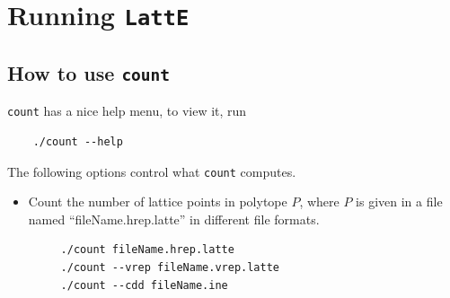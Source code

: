 \documentclass{article}
\begin{document}
\section{Running {\tt LattE}}\label{Running LattE}

\subsection{How to use {\tt count}}

{\tt count} has a nice help menu, to view it, run

\begin{verbatim}
	./count --help
\end{verbatim}


The following options control what {\tt count} computes.

\begin{itemize}
\item Count the number of lattice points in polytope $P$, where $P$  is given in a file named ``fileName.hrep.latte'' in different file formats.
	\begin{verbatim}
     ./count fileName.hrep.latte
     ./count --vrep fileName.vrep.latte
     ./count --cdd fileName.ine
	\end{verbatim} 


\end{itemize}
\end{document}
